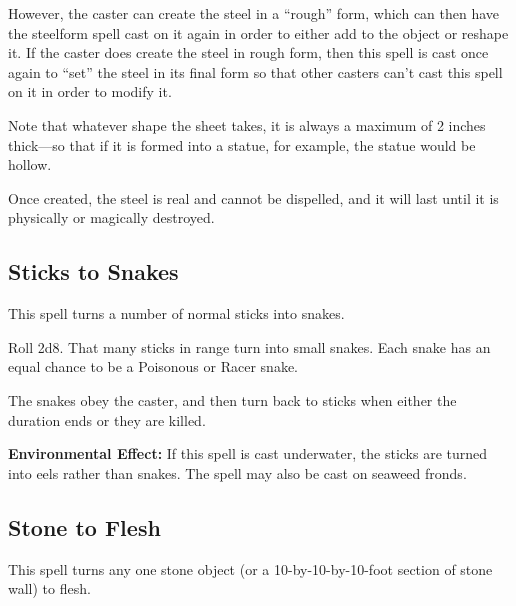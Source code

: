\begin{multicols*}{2}
However, the caster can create the steel in a “rough” form, which can then have the steelform spell cast on it again in order to either add to the object or reshape it. If the caster does create the steel in rough form, then this spell is cast once again to “set” the steel in its final form so that other casters can’t cast this spell on it in order to modify it.

Note that whatever shape the sheet takes, it is always a maximum of 2 inches thick—so that if it is formed into a statue, for example, the statue would be hollow.

Once created, the steel is real and cannot be dispelled, and it will last until it is physically or magically destroyed.

\subsection{Sticks to Snakes}\label{spell:Sticks to Snakes}

This spell turns a number of normal sticks into snakes.

Roll 2d8. That many sticks in range turn into small snakes. Each snake has an equal chance to be a Poisonous or Racer snake.

The snakes obey the caster, and then turn back to sticks when either the duration ends or they are killed.

\textbf{Environmental Effect:} If this spell is cast underwater, the sticks are turned into eels rather than snakes. The spell may also be cast on seaweed fronds.

\subsection{Stone to Flesh}\label{spell:Stone to Flesh}

This spell turns any one stone object (or a 10-by-10-by-10-foot section of stone wall) to flesh.


\end{multicols*}
